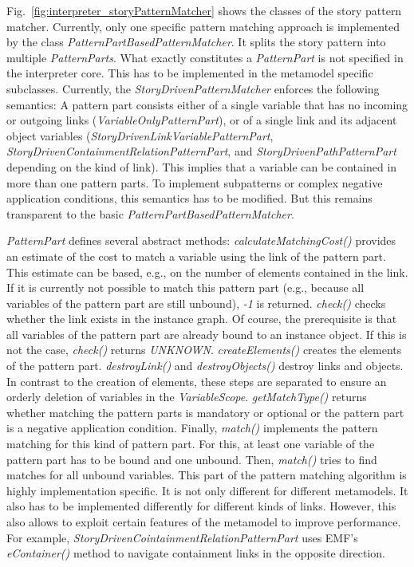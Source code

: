 Fig.~\ref{fig:interpreter_storyPatternMatcher} shows the classes of the story pattern matcher. Currently, only one specific pattern matching approach is implemented by the class \emph{PatternPartBasedPatternMatcher}. It splits the story pattern into multiple \emph{PatternParts}. What exactly constitutes a \emph{PatternPart} is not specified in the interpreter core. This has to be implemented in the metamodel specific subclasses. Currently, the \emph{StoryDrivenPatternMatcher} enforces the following semantics: A pattern part consists either of a single variable that has no incoming or outgoing links (\emph{VariableOnlyPatternPart}), or of a single link and its adjacent object variables (\emph{StoryDrivenLinkVariablePatternPart}, \emph{StoryDrivenContainmentRelationPatternPart}, and \emph{StoryDrivenPathPatternPart} depending on the kind of link). This implies that a variable can be contained in more than one pattern parts. To implement subpatterns or complex negative application conditions, this semantics has to be modified. But this remains transparent to the basic \emph{PatternPartBasedPatternMatcher}.

\emph{PatternPart} defines several abstract methods: \emph{calculateMatchingCost()} provides an estimate of the cost to match a variable using the link of the pattern part. This estimate can be based, e.g., on the number of elements contained in the link. If it is currently not possible to match this pattern part (e.g., because all variables of the pattern part are still unbound), \emph{-1} is returned. \emph{check()} checks whether the link exists in the instance graph. Of course, the prerequisite is that all variables of the pattern part are already bound to an instance object. If this is not the case, \emph{check()} returns \emph{UNKNOWN}. \emph{createElements()} creates the elements of the pattern part. \emph{destroyLink()} and \emph{destroyObjects()} destroy links and objects. In contrast to the creation of elements, these steps are separated to ensure an orderly deletion of variables in the \emph{VariableScope}. \emph{getMatchType()} returns whether matching the pattern parts is mandatory or optional or the pattern part is a negative application condition. Finally, \emph{match()} implements the pattern matching for this kind of pattern part. For this, at least one variable of the pattern part has to be bound and one unbound. Then, \emph{match()} tries to find matches for all unbound variables. This part of the pattern matching algorithm is highly implementation specific. It is not only different for different metamodels. It also has to be implemented differently for different kinds of links. However, this also allows to exploit certain features of the metamodel to improve performance. For example, \emph{StoryDrivenCointainmentRelationPatternPart} uses EMF's \emph{eContainer()} method to navigate containment links in the opposite direction.

